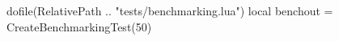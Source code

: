 \documentclass[oneside]{memoir}
\begin{document}
\pagestyle{empty}

\activateBenchmarking

\begin{luacode*}
	dofile(RelativePath .. "tests/benchmarking.lua")
	local benchout = CreateBenchmarkingTest(50)
\end{luacode*}

\PrintRpgTexErrors

\printRpgTexBenchmarking
\end{document}
